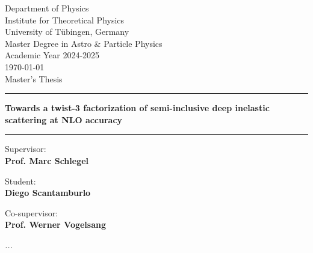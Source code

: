 
\thispagestyle{empty}
    
\begin{center}
   \vspace{1cm}
    \large{Department of Physics\\Institute for Theoretical Physics\\ University of Tübingen, Germany\\
   Master Degree in Astro \& Particle Physics\\
   Academic Year 2024-2025\\
   \today}\\
    \vspace*{1.5cm} 
    Master's Thesis
    \noindent\rule{\textwidth}{1pt}
   \textbf{\huge{Towards a twist-3 factorization of semi-inclusive deep inelastic scattering at NLO accuracy}}
   \noindent\rule{\textwidth}{1pt}
       
\end{center}

\vspace{20mm}

\noindent
\begin{minipage}[t]{0.45\textwidth} \raggedright 
{\Large Supervisor:\\ {\bf Prof. Marc Schlegel}}
\end{minipage}
\hfill
\begin{minipage}[t]{0.45\textwidth} \raggedleft
{\Large  Student: \\ {\bf Diego Scantamburlo}}
\end{minipage}
\vspace{5mm}

\noindent
\begin{minipage}[t]{0.55\textwidth}\raggedright 
{\Large Co-supervisor:\\ {\bf Prof. Werner Vogelsang}}
\end{minipage}

\vfill


\newpage
\textit{}
\newpage
\vspace{6cm}
\textit{...}
\newpage
\tableofcontents
\clearpage

\setcounter{page}{1} 
